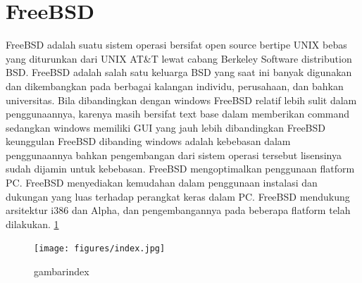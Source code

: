 ﻿%
\section{FreeBSD}
	FreeBSD adalah suatu sistem operasi bersifat open source bertipe UNIX bebas yang diturunkan dari UNIX AT\&T lewat cabang Berkeley Software distribution
	BSD. FreeBSD adalah salah satu keluarga BSD yang saat ini banyak digunakan dan dikembangkan pada berbagai kalangan individu,
	perusahaan, dan bahkan universitas. Bila dibandingkan dengan windows FreeBSD relatif lebih sulit dalam penggunaannya, karenya masih bersifat text base
	dalam memberikan command sedangkan windows memiliki GUI yang jauh lebih dibandingkan FreeBSD keunggulan FreeBSD dibanding windows
	adalah kebebasan dalam penggunaannya bahkan pengembangan dari sistem operasi tersebut lisensinya sudah dijamin untuk kebebasan.
	FreeBSD mengoptimalkan penggunaan flatform PC. FreeBSD menyediakan kemudahan dalam penggunaan instalasi dan dukungan yang luas terhadap perangkat keras dalam PC.
	FreeBSD mendukung arsitektur i386 dan Alpha, dan pengembangannya pada beberapa flatform telah dilakukan.
	\ref{index} 
	\begin{figure} [ht]
	\centerline{\texttt{[image: figures/index.jpg]}}
	\caption{gambarindex}
	\label {index}
	\end {figure}
